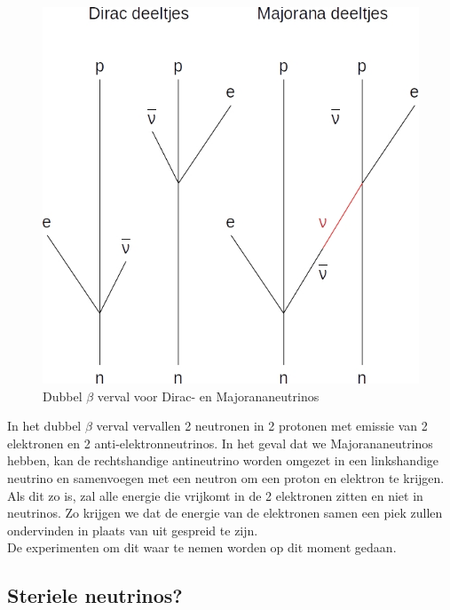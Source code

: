 \documentclass[../main.tex]{subfiles}
\begin{document}
\begin{figure}[h]
    \centering
    \includegraphics[width=0.5\linewidth]{neutrinos/dubbel_beta_verval.jpg}
    \caption{Dubbel $\beta$ verval voor Dirac- en Majorananeutrinos}%
    \label{fig:neutrinos/dubbel_beta_verval}
\end{figure}

In het dubbel $\beta$ verval vervallen 2 neutronen in 2 protonen met emissie van 2 elektronen en 2 anti-elektronneutrinos. In het geval dat we Majorananeutrinos hebben, kan de rechtshandige antineutrino worden omgezet in een linkshandige neutrino en samenvoegen met een neutron om een proton en elektron te krijgen. Als dit zo is, zal alle energie die vrijkomt in de 2 elektronen zitten en niet in neutrinos. Zo krijgen we dat de energie van de elektronen samen een piek zullen ondervinden in plaats van uit gespreid te zijn.\\
De experimenten om dit waar te nemen worden op dit moment gedaan.

\subsection{Steriele neutrinos?}%
\label{sub:steriele_neutrinos_}
\end{document}
